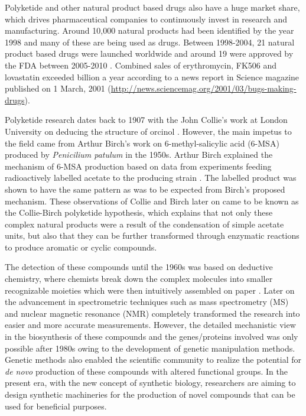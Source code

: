 	Polyketide and other natural product based drugs also have a huge market share, which drives pharmaceutical companies to continuously invest in research and manufacturing. Around 10,000 natural products had been identified by the year 1998 and many of these are being used as drugs. Between 1998-2004, 21 natural product based drugs were launched worldwide and around 19 were approved by the FDA between 2005-2010 \Parencite{Mishra2011, Mishra2011A}. Combined sales of erythromycin, FK506 and lovastatin exceeded  billion a year according to a news report in Science magazine published on 1 March, 2001 (\url{http://news.sciencemag.org/2001/03/bugs-making-drugs}).
	
	Polyketide research dates back to 1907 with the John Collie's work at London University on deducing the structure of orcinol \parencite{Collie1907}. However, the main impetus to the field came from Arthur Birch's work on 6-methyl-salicylic acid (6-MSA) produced by \textit{Penicilium patulum} in the 1950s. Arthur Birch explained the mechanism of 6-MSA production based on data from experiments feeding radioactively labelled acetate to the producing strain \parencite{Birch1955}. The labelled product was shown to have the same pattern as was to be expected from Birch's proposed mechanism. These observations of Collie and Birch later on came to be known as the Collie-Birch polyketide hypothesis, which explains that not only these complex natural products were a result of the condensation of simple acetate units, but also that they can be further transformed through enzymatic reactions to produce aromatic or cyclic compounds. 
		
	The detection of these compounds until the 1960s was based on deductive chemistry, where chemists break down the complex molecules into smaller recognizable moieties which were then intuitively assembled on paper \parencite{Powers2004}. Later on the advancement in spectrometric techniques such as mass spectrometry (MS) and nuclear magnetic resonance (NMR) completely transformed the research into easier and more accurate measurements. However, the detailed mechanistic view in the biosynthesis of these compounds and the genes/proteins involved was only possible after 1980s owing to the development of genetic manipulation methods. Genetic methods also enabled the scientific community to realize the potential for \textit{de novo} production of these compounds with altered functional groups. In the present era, with the new concept of synthetic biology, researchers are aiming to design synthetic machineries for the production of novel compounds that can be used for beneficial purposes. 
	
